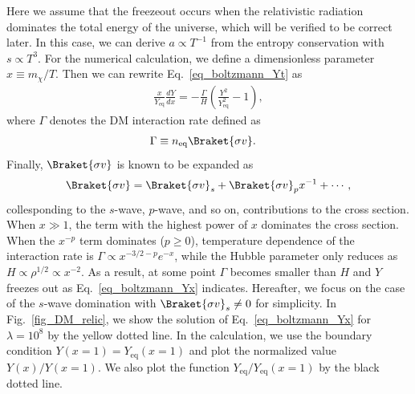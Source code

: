 \documentclass[12pt,twoside,book]{article}
\begin{document}
Here we assume that the freezeout occurs when the relativistic radiation
dominates the total energy of the universe, which will be verified to be
correct later.  In this case, we can derive $a \propto T^{-1}$ from the
entropy conservation with $s \propto T^3$.  For the numerical
calculation, we define a dimensionless parameter $x \equiv m_\chi / T$.
Then we can rewrite Eq.~\eqref{eq_boltzmann_Yt} as
\begin{align}
 \frac{x}{Y_{\mathrm{eq}}} \frac{d Y}{d x} =
 -\frac{\Gamma}{H} \left( \frac{Y^2}{Y_{\mathrm{eq}}^2} - 1 \right),\label{eq_boltzmann_Yx}
\end{align}
where $\Gamma$ denotes the DM interaction rate defined as
\begin{align}
 \Gamma &\equiv n_{\mathrm{eq}} \Braket{\sigma v}.\label{eq_lambda}
\end{align}
Finally, $\Braket{\sigma v}$ is known to be expanded
as~\cite{Gondolo:1990dk}
\begin{align}
 \Braket{\sigma v} = \Braket{\sigma v}_s +
 \Braket{\sigma v}_p x^{-1} + \cdots,
\end{align}
collesponding to the $s$-wave, $p$-wave, and so on, contributions to the
cross section.  When $x \gg 1$, the term with the highest power of $x$
dominates the cross section.  When the $x^{-p}$ term dominates ($p \geq
0$), temperature dependence of the interaction rate is $\Gamma \propto
x^{-3/2-p} e^{-x}$, while the Hubble parameter only reduces as $H
\propto \rho^{1/2} \propto x^{-2}$.  As a result, at some point $\Gamma$
becomes smaller than $H$ and $Y$ freezes out as
Eq.~\eqref{eq_boltzmann_Yx} indicates.  Hereafter, we focus on the case
of the $s$-wave domination with $\Braket{\sigma v}_s \neq 0$ for
simplicity.  
  In Fig.~\ref{fig_DM_relic}, we show the
solution of Eq.~\eqref{eq_boltzmann_Yx} for $\lambda = 10^8$ by the
yellow dotted line.  In the calculation, we use the boundary condition
$Y(x=1) = Y_{\mathrm{eq}} (x=1)$ and plot the normalized value $Y(x) /
Y(x=1)$.  We also plot the function $Y_{\mathrm{eq}} / Y_{\mathrm{eq}}
(x=1)$ by the black dotted line.
\end{document}
